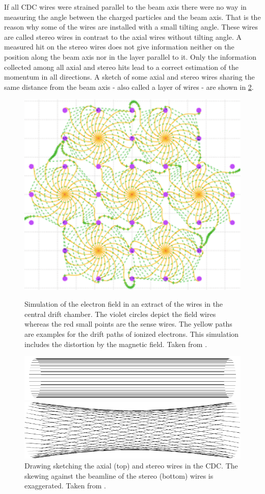 If all CDC wires were strained parallel to the beam axis there were no way in measuring the angle between the charged particles and the beam axis. That is the reason why some of the wires are installed with a small tilting angle. These wires are called stereo wires in contrast to the axial wires without tilting angle. A measured hit on the stereo wires does not give information neither on the position along the beam axis nor in the layer parallel to it. Only the information collected among all axial and stereo hits lead to a correct estimation of the momentum in all directions. A sketch of some axial and stereo wires sharing the same distance from the beam axis - also called a layer of wires - are shown in \ref{fig-axial-stereo}.

\begin{figure}
  \caption{Simulation of the electron field in an extract of the wires in the central drift chamber. The violet circles depict the field wires whereas the red small points are the sense wires. The yellow paths are examples for the drift paths of ionized electrons. This simulation includes the distortion by the magnetic field. Taken from \cite{cdc_design}.}
  \includegraphics[width=0.5\linewidth]{figures/experimental_setup/electronsInCDC.pdf}
  \label{fig-sense-wires}
\end{figure}


\begin{figure}
  \centering
  \includegraphics{figures/experimental_setup/axialLayers.pdf}
  
  \vspace*{1.5cm}
  
  \includegraphics{figures/experimental_setup/stereoLayers.pdf}
  \caption{Drawing sketching the axial (top) and stereo wires in the CDC. The skewing against the beamline of the stereo (bottom) wires is exaggerated. Taken from \cite{oliver}.}
  \label{fig-axial-stereo}
\end{figure}

